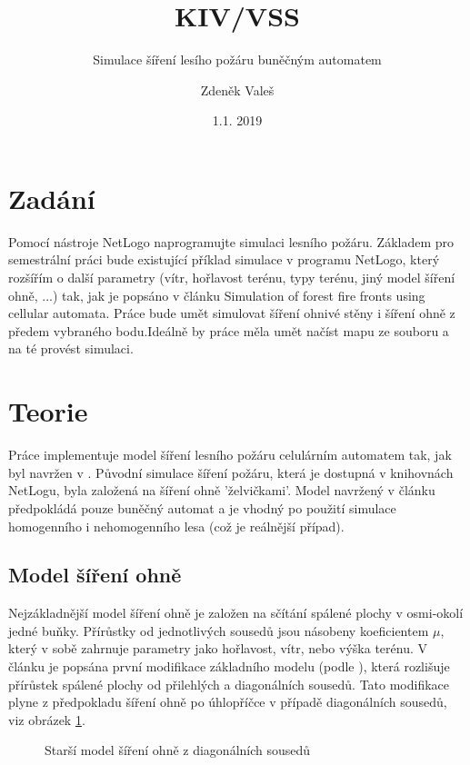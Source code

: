\documentclass[11pt,a4paper]{scrartcl}
\begin{document}
	\title{KIV/VSS}
	\subtitle{Simulace šíření lesího požáru buněčným automatem}
	\author{Zdeněk Valeš}
	\date{1.1. 2019}
	\maketitle
	\newpage
	
	\section{Zadání}
	Pomocí nástroje NetLogo naprogramujte simulaci lesního požáru. Základem pro semestrální práci bude existující příklad simulace v programu NetLogo, který rozšířím o další parametry (vítr, hořlavost terénu, typy terénu, jiný model šíření ohně, ...) tak, jak je popsáno v článku Simulation of forest fire fronts using cellular automata\cite{source_article}. Práce bude umět simulovat šíření ohnivé stěny i šíření ohně z předem vybraného bodu.Ideálně by práce měla umět načíst mapu ze souboru a na té provést simulaci.
	
	\section{Teorie}
	Práce implementuje model šíření lesního požáru celulárním automatem tak, jak byl navržen v \cite{source_article}. Původní simulace šíření požáru, která je dostupná v knihovnách NetLogu, byla založená na šíření ohně 'želvičkami'. Model navržený v článku předpokládá pouze buněčný automat a je vhodný po použití simulace homogenního i nehomogenního lesa (což je reálnější případ).
	
	\subsection{Model šíření ohně}
	Nejzákladnější model šíření ohně je založen na sčítání spálené plochy v osmi-okolí jedné buňky. Přírůstky od jednotlivých sousedů jsou násobeny koeficientem $\mu$, který v sobě zahrnuje parametry jako hořlavost, vítr, nebo výška terénu. V článku je popsána první modifikace základního modelu (podle \cite{old_model_art}), která rozlišuje přírůstek spálené plochy od přilehlých a diagonálních sousedů. Tato modifikace plyne z předpokladu šíření ohně po úhlopříčce v případě diagonálních sousedů, viz obrázek \ref{fig:diag-model-old}.
	
	\begin{figure} [H]
		\centering
		\caption{Starší model šíření ohně z diagonálních sousedů}
		\label{fig:diag-model-old}
	\end{figure}
\end{document}
